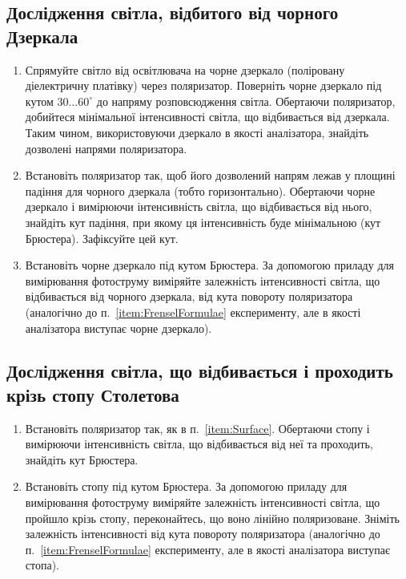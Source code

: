 \subsection{Дослідження світла, відбитого від чорного Дзеркала}
\begin{enumerate}
\item \label{item:Surface}Спрямуйте світло від освітлювача на чорне дзеркало (поліровану діелектричну платівку) через поляризатор. Поверніть чорне дзеркало під кутом $30\ldots60^\circ$ до напряму розповсюдження світла. Обертаючи поляризатор, добийтеся мінімальної інтенсивності світла, що відбивається від дзеркала. Таким чином, використовуючи дзеркало в якості аналізатора, знайдіть дозволені напрями поляризатора.
\item \label{item:FrenselFormulae} Встановіть поляризатор так, щоб його дозволений напрям лежав у площині падіння для чорного дзеркала (тобто горизонтально). Обертаючи чорне дзеркало і вимірюючи інтенсивність світла, що відбивається від нього, знайдіть кут падіння, при якому ця інтенсивність буде мінімальною (кут Брюстера). Зафіксуйте цей кут.
\item \label{item:MaluseMirror} Встановіть чорне дзеркало під кутом Брюстера. За допомогою приладу для вимірювання фотоструму виміряйте залежність інтенсивності світла, що відбивається від чорного дзеркала, від кута повороту поляризатора (аналогічно до п.~\ref{item:FrenselFormulae} експерименту, але в якості аналізатора виступає чорне дзеркало).
\end{enumerate}

\subsection{Дослідження світла, що відбивається і проходить крізь стопу Столетова}
\begin{enumerate}
\item Встановіть поляризатор так, як в п.~\ref{item:Surface}. Обертаючи стопу і вимірюючи інтенсивність світла, що відбивається від неї та проходить, знайдіть кут Брюстера.
\item Встановіть стопу під кутом Брюстера. За допомогою приладу для вимірювання фотоструму виміряйте залежність інтенсивності світла, що пройшло крізь стопу, переконайтесь, що воно лінійно поляризоване. Зніміть залежність інтенсивності від кута повороту поляризатора (аналогічно до п.~\ref{item:FrenselFormulae} експерименту, але в якості аналізатора виступає стопа).
\end{enumerate}

